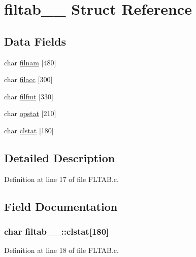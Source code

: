 \hypertarget{structfiltab__1__}{}\section{filtab\+\_\+\_\+ Struct Reference}
\label{structfiltab__1__}
\subsection*{Data Fields}
\begin{DoxyCompactItemize}
\item 
char \hyperlink{structfiltab__1___a1528d290e835f881a9cd027daeb59be1}{filnam} \mbox{[}480\mbox{]}
\item 
char \hyperlink{structfiltab__1___ae87377bdff4e91b875e19b14da21acf7}{filacc} \mbox{[}300\mbox{]}
\item 
char \hyperlink{structfiltab__1___a7b22fc236359553ca430377448498c67}{filfmt} \mbox{[}330\mbox{]}
\item 
char \hyperlink{structfiltab__1___a1ad8a608f1d97169238d280ca846de62}{opstat} \mbox{[}210\mbox{]}
\item 
char \hyperlink{structfiltab__1___adeb27c2265991049aed80a6af9b33656}{clstat} \mbox{[}180\mbox{]}
\end{DoxyCompactItemize}


\subsection{Detailed Description}


Definition at line 17 of file F\+L\+T\+A\+B.\+c.



\subsection{Field Documentation}
\subsubsection[{\texorpdfstring{clstat}{clstat}}]{\setlength{\rightskip}{0pt plus 5cm}char filtab\+\_\+\_\+\+::clstat\mbox{[}180\mbox{]}}\hypertarget{structfiltab__1___adeb27c2265991049aed80a6af9b33656}{}\label{structfiltab__1___adeb27c2265991049aed80a6af9b33656}


Definition at line 18 of file F\+L\+T\+A\+B.\+c.

